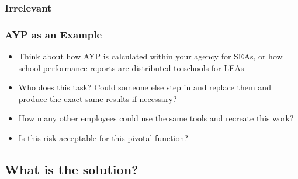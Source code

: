 \documentclass[12pt,handout]{beamer}
\begin{document}
{
\begin{frame}[plain]
\frametitle{Irrelevant}
\end{frame}
}

\begin{frame}
\frametitle{AYP as an Example}
  \begin{itemize}
  \item Think about how AYP is calculated within your agency for SEAs, or how school performance reports are distributed to schools for LEAs
  \item Who does this task? Could someone else step in and replace them and produce the exact same results if necessary?
  \item How many other employees could use the same tools and recreate this work?
  \item Is this risk acceptable for this pivotal function?
  \end{itemize}
\end{frame}


\subsection{What is the solution?}
\end{document}
